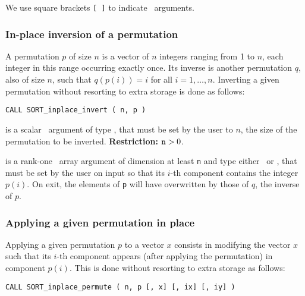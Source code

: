 \documentclass{galahad}
\newcommand{\packagename}{SORT}
\begin{document}
\noindent
We use square brackets {\tt [ ]} to indicate \optional\ arguments.

\subsubsection{In-place inversion of a permutation}

A permutation $p$ of size $n$ is a vector of $n$ integers ranging from 1 to $n$,
each integer in this range occurring exactly once. Its inverse is another
permutation $q$, also of size $n$, such that $q(p(i))=i$ for all $i=1,\ldots,n$.
Inverting a given permutation without resorting to extra storage is done as
follows:
\vspace*{1mm}

\hspace{8mm}
{\tt CALL \packagename\_inplace\_invert ( n, p )}

\vspace*{-3mm}
\begin{description}
 is a scalar \intentin\ argument of type 
\integer, that must be set by the user to $n$, the size of the permutation to
be inverted.
{\bf Restriction:} ${\tt n} > 0$.

 is a rank-one \intentinout\ array argument of
dimension at least {\tt n} and type either 
\integer\ or \realdp, that must be set by the user
on input so that its $i$-th component contains the integer $p(i)$.
On exit, the elements of {\tt p} will have overwritten by those of $q$, the
inverse of $p$.

\end{description}

\subsubsection{Applying a given permutation in place}

Applying a given permutation $p$ to a vector $x$ consists in modifying the
vector $x$ such that its $i$-th component appears (after applying the
permutation) in component $p(i)$.
This is done without resorting to extra storage as follows:
\vspace*{1mm}

{\tt CALL \packagename\_inplace\_permute ( n, p [, x] [, ix] [, iy] )}
\end{document}
